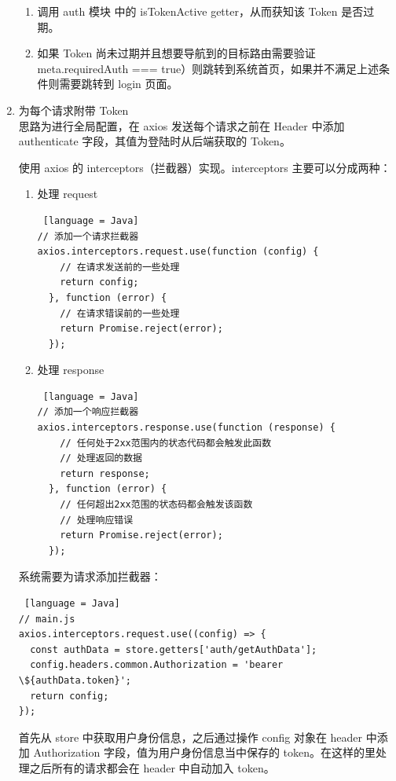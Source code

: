 \begin{enumerate}
\begin{enumerate}
          \item 调用 auth 模块 中的 isTokenActive getter，从而获知该 Token 是否过期。
          \item 如果 Token 尚未过期并且想要导航到的目标路由需要验证\\meta.requiredAuth === true）则跳转到系统首页，如果并不满足上述条件则需要跳转到 login 页面。
        \end{enumerate}
  \item 为每个请求附带 Token\\
        思路为进行全局配置，在 axios 发送每个请求之前在 Header 中添加 authenticate 字段，其值为登陆时从后端获取的 Token。

        使用 axios 的 interceptors（拦截器）实现。interceptors 主要可以分成两种：
        \begin{enumerate}
          \item 处理 request
                \begin{lstlisting} [language = Java]
// 添加一个请求拦截器
axios.interceptors.request.use(function (config) {
    // 在请求发送前的一些处理
    return config;
  }, function (error) {
    // 在请求错误前的一些处理
    return Promise.reject(error);
  });

                \end{lstlisting}
          \item 处理 response
                \begin{lstlisting} [language = Java]
// 添加一个响应拦截器
axios.interceptors.response.use(function (response) {
    // 任何处于2xx范围内的状态代码都会触发此函数
    // 处理返回的数据
    return response;
  }, function (error) {
    // 任何超出2xx范围的状态码都会触发该函数
    // 处理响应错误
    return Promise.reject(error);
  });
\end{lstlisting}
        \end{enumerate}
        系统需要为请求添加拦截器：
        \begin{lstlisting} [language = Java]
// main.js
axios.interceptors.request.use((config) => {
  const authData = store.getters['auth/getAuthData'];
  config.headers.common.Authorization = 'bearer \${authData.token}';
  return config;
});
    \end{lstlisting}
        首先从 store 中获取用户身份信息，之后通过操作 config 对象在 header 中添加 Authorization 字段，值为用户身份信息当中保存的 token。在这样的里处理之后所有的请求都会在 header 中自动加入 token。
\end{enumerate}

